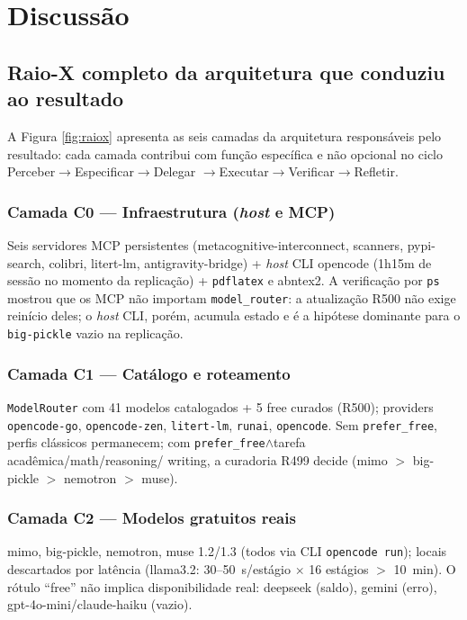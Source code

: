 \chapter{Discussão}

\section{Raio-X completo da arquitetura que conduziu ao resultado}

A Figura \ref{fig:raiox} apresenta as seis camadas da arquitetura
responsáveis pelo resultado: cada camada contribui com função específica e
não opcional no ciclo Perceber$\rightarrow$Especificar$\rightarrow$Delegar
$\rightarrow$Executar$\rightarrow$Verificar$\rightarrow$Refletir.



\subsection*{Camada C0 --- Infraestrutura (\textit{host} e MCP)}
Seis servidores MCP persistentes (metacognitive-interconnect, scanners,
pypi-search, colibri, litert-lm, antigravity-bridge) + \textit{host} CLI
opencode (1h15m de sessão no momento da replicação) + \texttt{pdflatex} e
abntex2. A verificação por \texttt{ps} mostrou que os MCP não importam
\texttt{model\_router}: a atualização R500 não exige reinício deles; o
\textit{host} CLI, porém, acumula estado e é a hipótese dominante para o
\texttt{big-pickle} vazio na replicação.

\subsection*{Camada C1 --- Catálogo e roteamento}
\texttt{ModelRouter} com 41 modelos catalogados + 5 free curados (R500);
providers \texttt{opencode-go}, \texttt{opencode-zen}, \texttt{litert-lm},
\texttt{runai}, \texttt{opencode}. Sem \texttt{prefer\_free}, perfis clássicos
permanecem; com \texttt{prefer\_free}$\wedge$tarefa acadêmica/math/reasoning/
writing, a curadoria R499 decide (mimo $>$ big-pickle $>$ nemotron $>$
muse).

\subsection*{Camada C2 --- Modelos gratuitos reais}
mimo, big-pickle, nemotron, muse 1.2/1.3 (todos via CLI \texttt{opencode
run}); locais descartados por latência (llama3.2: 30--50~s/estágio $\times$ 16
estágios $>$ 10~min). O rótulo ``free'' não implica disponibilidade real:
deepseek (saldo), gemini (erro), gpt-4o-mini/claude-haiku (vazio).

